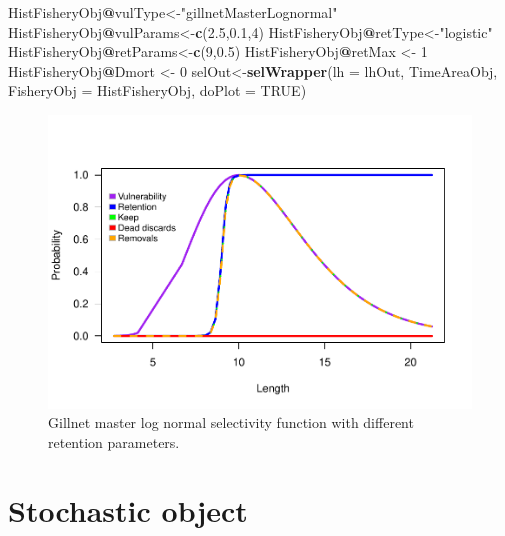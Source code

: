\documentclass[
]{book}
\newenvironment{Shaded}{\begin{snugshade}}{\end{snugshade}}
\newcommand{\AttributeTok}[1]{\textcolor[rgb]{0.13,0.29,0.53}{#1}}
\newcommand{\ConstantTok}[1]{\textcolor[rgb]{0.56,0.35,0.01}{#1}}
\newcommand{\DecValTok}[1]{\textcolor[rgb]{0.00,0.00,0.81}{#1}}
\newcommand{\FloatTok}[1]{\textcolor[rgb]{0.00,0.00,0.81}{#1}}
\newcommand{\FunctionTok}[1]{\textcolor[rgb]{0.13,0.29,0.53}{\textbf{#1}}}
\newcommand{\NormalTok}[1]{#1}
\newcommand{\OtherTok}[1]{\textcolor[rgb]{0.56,0.35,0.01}{#1}}
\newcommand{\SpecialCharTok}[1]{\textcolor[rgb]{0.81,0.36,0.00}{\textbf{#1}}}
\newcommand{\StringTok}[1]{\textcolor[rgb]{0.31,0.60,0.02}{#1}}
\begin{document}
\begin{Shaded}
\begin{Highlighting}[]
\NormalTok{HistFisheryObj}\SpecialCharTok{@}\NormalTok{vulType}\OtherTok{\textless{}{-}}\StringTok{"gillnetMasterLognormal"}
\NormalTok{HistFisheryObj}\SpecialCharTok{@}\NormalTok{vulParams}\OtherTok{\textless{}{-}}\FunctionTok{c}\NormalTok{(}\FloatTok{2.5}\NormalTok{,}\FloatTok{0.1}\NormalTok{,}\DecValTok{4}\NormalTok{)}
\NormalTok{HistFisheryObj}\SpecialCharTok{@}\NormalTok{retType}\OtherTok{\textless{}{-}}\StringTok{"logistic"}
\NormalTok{HistFisheryObj}\SpecialCharTok{@}\NormalTok{retParams}\OtherTok{\textless{}{-}}\FunctionTok{c}\NormalTok{(}\DecValTok{9}\NormalTok{,}\FloatTok{0.5}\NormalTok{)}
\NormalTok{HistFisheryObj}\SpecialCharTok{@}\NormalTok{retMax }\OtherTok{\textless{}{-}} \DecValTok{1}
\NormalTok{HistFisheryObj}\SpecialCharTok{@}\NormalTok{Dmort }\OtherTok{\textless{}{-}} \DecValTok{0}
\NormalTok{selOut}\OtherTok{\textless{}{-}}\FunctionTok{selWrapper}\NormalTok{(}\AttributeTok{lh =}\NormalTok{ lhOut, TimeAreaObj, }\AttributeTok{FisheryObj =}\NormalTok{ HistFisheryObj, }\AttributeTok{doPlot =} \ConstantTok{TRUE}\NormalTok{)}
\end{Highlighting}
\end{Shaded}

\begin{figure}
\centering
\includegraphics{_main_files/figure-latex/sel5-1.pdf}
\caption{\label{fig:sel5}Gillnet master log normal selectivity function with different retention parameters.}
\end{figure}

\section{Stochastic object}\label{stochastic-object}
\end{document}
